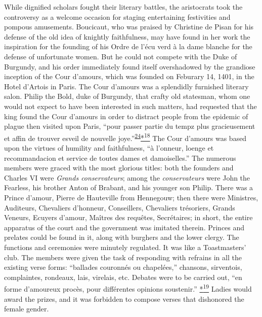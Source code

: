 While dignified scholars fought their literary battles, the aristocrats
took the controversy as a welcome occasion for staging entertaining
festivities and pompous amusements. Boucicaut, who was praised by
Christine de Pisan for his defense of the old idea of knightly
faithfulness, may have found in her work the inspiration for the
founding of his Ordre de l'écu verd à la dame blanche for the defense of
unfortunate women. But he could not compete with the Duke of Burgundy,
and his order immediately found itself overshadowed by the grandiose
inception of the Cour d'amours, which was founded on Feburary 14, 1401,
in the Hotel d'Artois in Paris. The Cour d'amours was a splendidly
furnished literary salon. Philip the Bold, duke of Burgundy, that crafty
old statesman, whom one would not expect to have been interested in such
matters, had requested that the king found the Cour d'amours in order to
distract people from the epidemic of plague then visited upon Paris,
``pour passer partie du tempz plus gracieusement et affin de trouver
esveil de nouvelle
joye.''\textsuperscript{\protect\hypertarget{11_Chapter_Four__THE_FORMS_OF_LOVE.xhtmlux5cux23id_1440}{\protect\hyperlink{23_NOTES.xhtmlux5cux23id_1441}{24}}}\protect\hypertarget{11_Chapter_Four__THE_FORMS_OF_LOVE.xhtmlux5cux23id_3135}{\protect\hyperlink{23_NOTES.xhtmlux5cux23id_3136}{*\textsuperscript{18}}}
The Cour d'amours was based upon the virtues of humility and
faithfulness, ``à l'onneur, loenge et recommandacion et service de
toutes dames et damoiselles.'' The numerous members were graced with the
most glorious titles: both the founders and Charles VI were \emph{Grands
conservateurs}; among the \emph{conservateurs} were John the Fearless,
his brother Anton of Brabant, and his younger son Philip. There was a
Prince d'amour, Pierre de Hauteville from Hennegouw; then there were
Ministres, Auditeurs, Chevaliers d'honneur, Conseillers, Chevaliers
trésoriers,
\protect\hypertarget{11_Chapter_Four__THE_FORMS_OF_LOVE.xhtmlux5cux23page_141}{}{}Grands
Veneurs, Ecuyers d'amour, Maîtres des requêtes, Secrétaires; in short,
the entire apparatus of the court and the government was imitated
therein. Princes and prelates could be found in it, along with burghers
and the lower clergy. The functions and ceremonies were minutely
regulated. It was like a Toastmasters' club. The members were given the
task of responding with refrains in all the existing verse forms:
``ballades couronnés ou chapelées,'' chansons, sirventois, complaintes,
rondeaux, lais, virelais, etc. Debates were to be carried out, ``en
forme d'amoureux procès, pour différentes opinions soustenir.''
\protect\hypertarget{11_Chapter_Four__THE_FORMS_OF_LOVE.xhtmlux5cux23id_3137}{\protect\hyperlink{23_NOTES.xhtmlux5cux23id_3138}{*\textsuperscript{19}}}
Ladies would award the prizes, and it was forbidden to compose verses
that dishonored the female gender.


